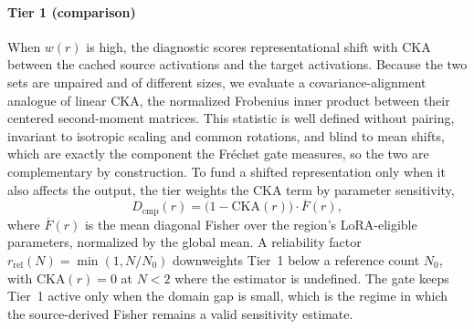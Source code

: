 \paragraph{Tier 1 (comparison)}
When $w(r)$ is high, the diagnostic scores representational shift with CKA~\cite{Kornblith2019CKA} between the cached source activations and the target activations.
Because the two sets are unpaired and of different sizes, we evaluate a covariance-alignment analogue of linear CKA, the normalized Frobenius inner product between their centered second-moment matrices.
This statistic is well defined without pairing, invariant to isotropic scaling and common rotations, and blind to mean shifts, which are exactly the component the Fr\'{e}chet gate measures, so the two are complementary by construction.
To fund a shifted representation only when it also affects the output, the tier weights the CKA term by parameter sensitivity,
%
\begin{equation}
\label{eq:tier1-score}
    D_\text{cmp}(r) = \bigl(1 - \mathrm{CKA}(r)\bigr) \cdot \overline{F}(r),
\end{equation}
%
where $\overline{F}(r)$ is the mean diagonal Fisher over the region's LoRA-eligible parameters, normalized by the global mean.
A reliability factor $r_\text{rel}(N) = \min(1, N/N_0)$ downweights Tier~1 below a reference count $N_0$, with $\mathrm{CKA}(r) = 0$ at $N < 2$ where the estimator is undefined.
The gate keeps Tier~1 active only when the domain gap is small, which is the regime in which the source-derived Fisher remains a valid sensitivity estimate.

